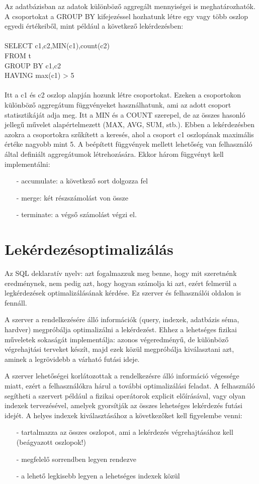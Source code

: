 \documentclass[12pt]{article}
\theoremstyle{plain}
\begin{document}
Az adatbázisban az adatok különböző aggregált mennyiségei is meghatározhatók. A csoportokat a GROUP BY kifejezéssel hozhatunk létre egy vagy több oszlop egyedi értékeiből,
mint például a következő lekérdezésben:
\\
\\
SELECT c1,c2,MIN(c1),count(c2) \\
FROM t \\
GROUP BY c1,c2 \\
HAVING max(c1) > 5 \\
\\
Itt a c1 és c2 oszlop alapján hozunk létre csoportokat. Ezeken a csoportokon különböző
aggregátum függvényeket használhatunk, ami az adott csoport statisztikáját adja meg. Itt
a MIN és a COUNT szerepel, de az összes hasonló jellegű művelet alapértelmezett (MAX, AVG, SUM, stb.).
Ebben a lekérdezésben azokra a csoportokra szűkített a keresés, ahol a csoport c1 oszlopának maximális értéke nagyobb
mint 5.
A beépített függvények mellett lehetőség van felhasználó által definiált aggregátumok létrehozására.
Ekkor három függvényt kell implementálni:
\begin{itemize}
\item[-] accumulate: a következő sort dolgozza fel
\item[-] merge: két részszámolást von össze
\item[-] terminate: a végső számolást végzi el.
\end{itemize} 


\section{Lekérdezésoptimalizálás}


Az SQL deklaratív nyelv: azt fogalmazzuk meg benne, hogy mit szeretnénk eredménynek, nem pedig azt, hogy hogyan számolja ki azt, ezért felmerül a legkérdezések optimalizálásának kérdése. Ez szerver és felhasználói oldalon is fennáll.\par
A szerver a rendelkezésére álló információk (query, indexek, adatbázis séma, hardver) megpróbálja optimalizálni a lekérdezést. Ehhez 
a lehetséges fizikai műveletek sokaságát implementálja: azonos végeredményű, de különböző végrehajtási terveket készít, majd ezek közül megpróbálja kiválasztani azt, aminek a legrövidebb a várható futási ideje.\par

A szerver lehetőségei korlátozottak a rendelkezésre álló információ végessége miatt, ezért a felhasználókra hárul a további optimalizálási
feladat. A felhasználó segítheti a szervert például a fizikai operátorok explicit előírásával, vagy olyan indexek tervezésével, amelyek gyorsítják az összes lehetséges lekérdezés futási idejét. A helyes indexek kiválasztásához a következőket kell figyelembe venni:
\begin{itemize}
\item[-] tartalmazza az összes oszlopot, ami a lekérdezés végrehajtásához kell (beágyazott oszlopok!)
\item[-] megfelelő sorrendben legyen rendezve
\item[-] a lehető legkisebb legyen a lehetséges indexek közül
\end{itemize} 
\end{document}

